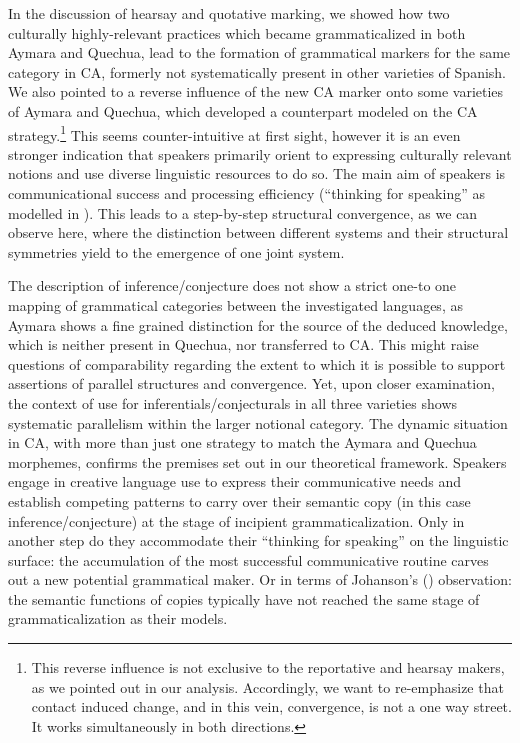 \documentclass[output=paper,hidelinks]{langscibook}
\begin{document}
In the discussion of hearsay and quotative marking, we showed how two culturally highly-relevant practices which became grammaticalized in both Aymara and Quechua, lead to the formation of grammatical markers for the same category in CA, formerly not systematically present in other varieties of Spanish. We also pointed to a reverse influence of the new CA marker onto some varieties of Aymara and Quechua, which developed a counterpart modeled on the CA strategy.\footnote{This reverse influence is not exclusive to the reportative and hearsay makers, as we pointed out in our analysis. Accordingly, we want to re-emphasize that contact induced change, and in this vein, convergence, is not a one way street. It works simultaneously in both directions. } This seems counter-intuitive at first sight, however it is an even stronger indication that speakers primarily orient to expressing culturally relevant notions and use diverse linguistic resources to do so. The main aim of speakers is communicational success and processing efficiency (“thinking for speaking” as modelled in \citealt{slobin2016thinking}). This leads to a step-by-step structural convergence, as we can observe here, where the distinction between different systems and their structural symmetries yield to the emergence of one joint system.

The description of inference/conjecture does not show a strict one-to one mapping of grammatical categories between the investigated languages, as Aymara shows a fine grained distinction for the source of the deduced knowledge, which is neither present in Quechua, nor transferred to CA. This might raise questions of comparability regarding the extent to which it is possible to support assertions of parallel structures and convergence. Yet, upon closer examination, the context of use for inferentials/conjecturals in all three varieties shows systematic parallelism within the larger notional category. The dynamic situation in CA, with more than just one strategy to match the Aymara and Quechua morphemes, confirms the premises set out in our theoretical framework. Speakers engage in creative language use to express their communicative needs \citep{babel2014doing} and establish competing patterns to carry over their semantic copy (in this case inference/conjecture) at the stage of incipient grammaticalization. Only in another step do they accommodate their “thinking for speaking” \citep{slobin2016thinking} on the linguistic surface: the accumulation of the most successful communicative routine carves out a new potential grammatical maker. Or in terms of Johanson's (\citeyear{RN59}) observation: the semantic functions of copies typically have not reached the same stage of grammaticalization as their models.
\end{document}
